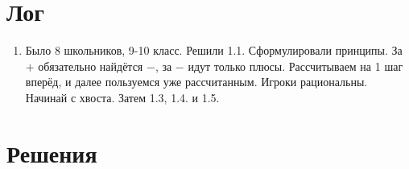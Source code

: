 \documentclass[12pt]{article}
\newcounter{problem}[section]
\begin{document}
\section{Лог}

\begin{enumerate}
  \item Было 8 школьников, 9-10 класс. Решили 1.1. Сформулировали принципы.
  За $+$ обязательно найдётся $-$, за $-$ идут только плюсы.
  Рассчитываем на 1 шаг вперёд, и далее пользуемся уже рассчитанным.
  Игроки рациональны. Начинай с хвоста. Затем 1.3, 1.4. и 1.5.
\end{enumerate}




\renewenvironment{solution}[1]{%
         \vskip .5cm plus 2cm minus 0.1cm%
         {\bfseries \hyperlink{problem:#1}{#1.}}%
}%
{%
}%

\section{Решения}

\end{document}
